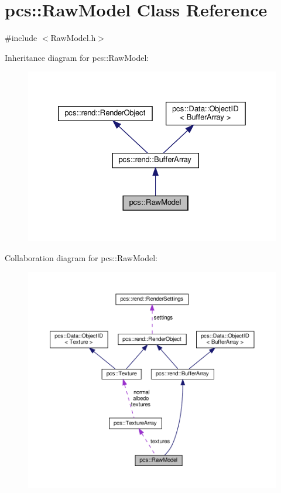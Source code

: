 \hypertarget{classpcs_1_1RawModel}{}\section{pcs\+:\+:Raw\+Model Class Reference}
\label{classpcs_1_1RawModel}


{\ttfamily \#include $<$Raw\+Model.\+h$>$}



Inheritance diagram for pcs\+:\+:Raw\+Model\+:
\nopagebreak
\begin{figure}[H]
\begin{center}
\leavevmode
\includegraphics[width=326pt]{classpcs_1_1RawModel__inherit__graph}
\end{center}
\end{figure}


Collaboration diagram for pcs\+:\+:Raw\+Model\+:
\nopagebreak
\begin{figure}[H]
\begin{center}
\leavevmode
\includegraphics[width=350pt]{classpcs_1_1RawModel__coll__graph}
\end{center}
\end{figure}
